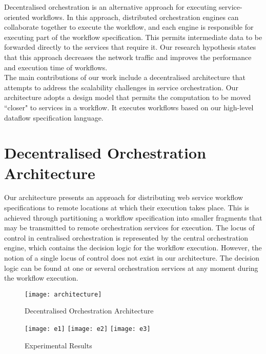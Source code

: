 \documentclass[10pt, conference, compsocconf]{IEEEtran}
\begin{document}
Decentralised orchestration is an alternative approach for executing service-oriented workflows. In this approach, distributed orchestration engines can collaborate together to execute the workflow, and each engine is responsible for executing part of the workflow specification. This permits intermediate data to be forwarded directly to the services that require it. Our research hypothesis states that this approach decreases the network traffic and improves the performance and execution time of workflows.\\

The main contributions of our work include a decentralised architecture that attempts to address the scalability challenges in service orchestration. Our architecture adopts a design model that permits the computation to be moved ``closer" to services in a workflow. It executes workflows based on our high-level dataflow specification language.

\section{Decentralised Orchestration Architecture}

Our architecture presents an approach for distributing web service workflow specifications to remote locations at which their execution takes place. This is achieved through partitioning a workflow specification into smaller fragments that may be transmitted to remote orchestration services for execution. The locus of control in centralised orchestration is represented by the central orchestration engine, which contains the decision logic for the workflow execution. However, the notion of a single locus of control does not exist in our architecture. The decision logic can be found at one or several orchestration services at any moment during the workflow execution.\\

\begin{figure}[h]
\centerline{\texttt{[image: architecture]}}
\label{fig:fig6}
\caption{Decentralised Orchestration Architecture}
\end{figure} 

\begin{figure*}[t]
\centerline{\texttt{[image: e1]} \texttt{[image: e2]} \texttt{[image: e3]}}
\label{fig:fig9}
\caption{Experimental Results}
\end{figure*}
\end{document}
